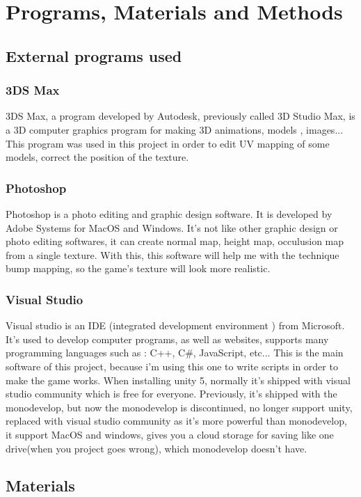 \documentclass[a4paper, 13pt]{extarticle}
\begin{document}
 \vspace{0.35 cm}
  \section{\Large Programs, Materials and Methods}
  	\subsection{External programs used}
  		\subsubsection{3DS Max}
 		 3DS Max, a program developed by Autodesk, previously called 3D Studio Max, is a 3D computer graphics program for making 3D animations, models , images...
 		 This program was used in this project in order to edit UV mapping of some models, correct the position of the texture. 
 		 \subsubsection{Photoshop}
 		 Photoshop is a photo editing and graphic design software. It is developed by Adobe Systems for MacOS and Windows. It's not like other graphic design or photo editing softwares, it can create normal map, height map, occulusion map from a single texture. With this, this software will help me with the technique bump mapping, so the game's texture will look more realistic. 
 		 \subsubsection{Visual Studio}
 		 Visual studio is an IDE (integrated development environment ) from Microsoft. It's used to develop computer programs, as well as websites, supports many programming languages such as : C++, C\#, JavaScript, etc... 
 		 This is the main software of this project, because i'm using this one to write scripts in order to make the game works.
 		 When installing unity 5, normally it's shipped with visual studio community which is free for everyone. Previously, it's shipped with the monodevelop, but now the monodevelop is discontinued, no longer support unity, replaced with visual studio community as it's more powerful than monodevelop, it support MacOS and windows, gives you a cloud storage for saving like one drive(when you project goes wrong), which monodevelop doesn't have.  
 		
 		 
 		 
 		 \subsection{Materials}
\end{document}
